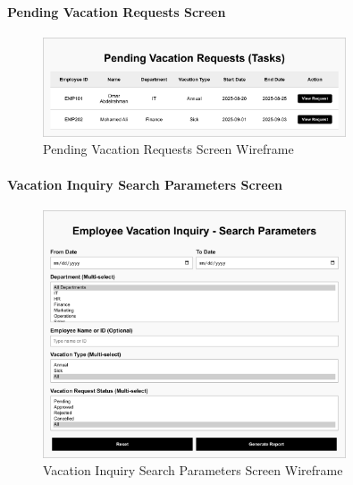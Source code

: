 \documentclass[12pt,a4paper]{article}
\begin{document}
\paragraph{Pending Vacation Requests Screen}
\begin{figure}[H]
\centering
\includegraphics[width=0.8\textwidth]{Wireframes/Pending-Vacation-Requests/Pending-Vacation-Requests-1.png}
\caption{Pending Vacation Requests Screen Wireframe}
\label{fig:wireframe-pending-vacation-requests}
\end{figure}

\paragraph{Vacation Inquiry Search Parameters Screen}
\begin{figure}[H]
\centering
\includegraphics[width=0.8\textwidth]{Wireframes/Employee-Vacation-Inquiry-Search-Parameters/Employee-Vacation-Inquiry-Search-Parameters-1.png}
\caption{Vacation Inquiry Search Parameters Screen Wireframe}
\label{fig:wireframe-inquiry-search-params}
\end{figure}
\end{document}
